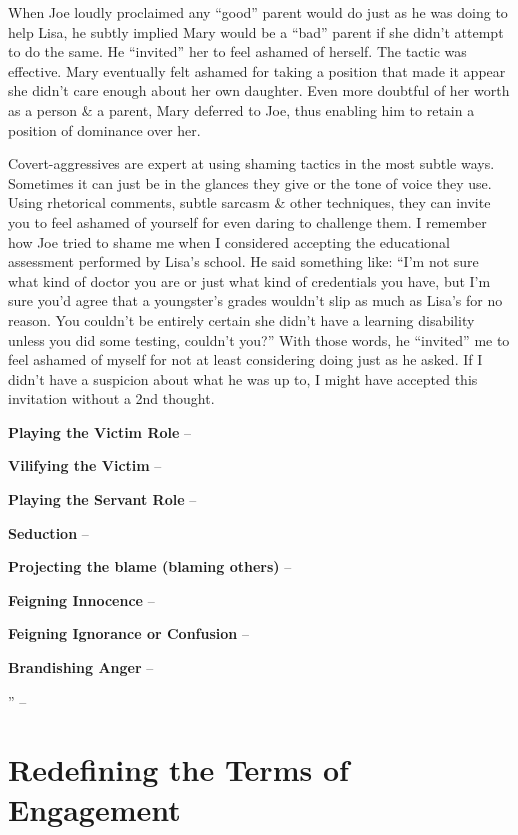 \documentclass{article}
\numberwithin{equation}{section}
\begin{document}
When Joe loudly proclaimed any ``good'' parent would do just as he was doing to help Lisa, he subtly implied Mary would be a ``bad'' parent if she didn't attempt to do the same. He ``invited'' her to feel ashamed of herself. The tactic was effective. Mary eventually felt ashamed for taking a position that made it appear she didn't care enough about her own daughter. Even more doubtful of her worth as a person \& a parent, Mary deferred to Joe, thus enabling him to retain a position of dominance over her.

Covert-aggressives are expert at using shaming tactics in the most subtle ways. Sometimes it can just be in the glances they give or the tone of voice they use. Using rhetorical comments, subtle sarcasm \& other techniques, they can invite you to feel ashamed of yourself for even daring to challenge them. I remember how Joe tried to shame me when I considered accepting the educational assessment performed by Lisa's school. He said something like: ``I'm not sure what kind of doctor you are or just what kind of credentials you have, but I'm sure you'd agree that a youngster's grades wouldn't slip as much as Lisa's for no reason. You couldn't be entirely certain she didn't have a learning disability unless you did some testing, couldn't you?'' With those words, he ``invited'' me to feel ashamed of myself for not at least considering doing just as he asked. If I didn't have a suspicion about what he was up to, I might have accepted this invitation without a 2nd thought.

\textbf{Playing the Victim Role} -- 

\textbf{Vilifying the Victim} -- 

\textbf{Playing the Servant Role} -- 

\textbf{Seduction} -- 

\textbf{Projecting the blame (blaming others)} -- 

\textbf{Feigning Innocence} --

\textbf{Feigning Ignorance or Confusion} -- 

\textbf{Brandishing Anger} -- 

'' -- \cite[pp. 91--]{Simon2010}


\section{Redefining the Terms of Engagement}
\end{document}
